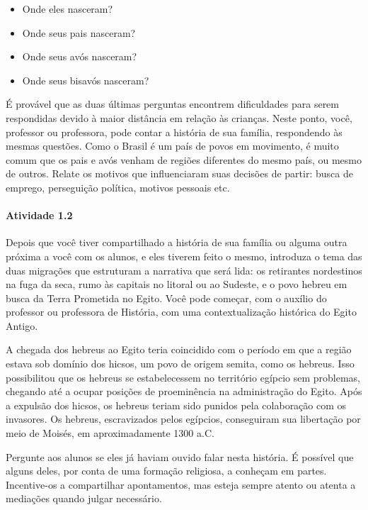 \documentclass[11pt]{extarticle}
\begin{document}
\begin{itemize}
\item Onde eles nasceram?
\item Onde seus pais nasceram?
\item Onde seus avós nasceram?
\item Onde seus bisavós nasceram? 
\end{itemize}

É provável que as duas últimas perguntas encontrem dificuldades para serem respondidas
devido à maior distância em relação às crianças. 
Neste ponto, você, professor ou professora, pode contar a história de sua família,
respondendo às mesmas questões. 
Como o Brasil é um país de povos em movimento, é muito comum que os pais e avós venham de regiões diferentes
do mesmo país, ou mesmo de outros. Relate os motivos que influenciaram suas decisões de partir:
busca de emprego, perseguição política, motivos pessoais etc.


\paragraph{Atividade 1.2} 

Depois que você tiver compartilhado a história de sua família ou alguma outra próxima a você com os alunos,
e eles tiverem feito o mesmo, introduza o tema das duas migrações que estruturam a narrativa que será lida:
os retirantes nordestinos na fuga da seca, rumo às capitais no litoral ou ao Sudeste, e o povo hebreu
em busca da Terra Prometida no Egito.
Você pode começar, com o auxílio do professor ou professora de História, com uma contextualização 
histórica do Egito Antigo. 

A chegada dos hebreus ao Egito teria coincidido com o período em que a região 
estava sob domínio dos hicsos, um povo de origem semita, como os hebreus. Isso possibilitou que os hebreus 
se estabelecessem no território egípcio sem problemas, chegando até a ocupar posições de proeminência na 
administração do Egito. Após a expulsão dos hicsos, os hebreus teriam sido punidos pela colaboração com os 
invasores. Os hebreus, escravizados pelos egípcios, conseguiram sua libertação por meio de Moisés, em 
aproximadamente 1300 a.C.

Pergunte aos alunos se eles já haviam ouvido falar nesta história. É possível que alguns deles, 
por conta de uma formação religiosa, a conheçam em partes. Incentive-os a compartilhar
apontamentos, mas esteja sempre atento ou atenta a mediações quando julgar necessário.
\end{document}
